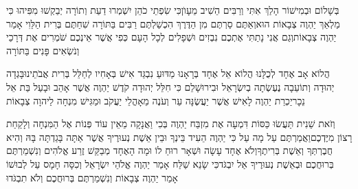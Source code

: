 \documentclass[../main/main.tex]{subfiles}
\begin{document}
\begin{multicols}{\ncols}
בְּשָׁלוֹם וּבְמִישׁוֹר הָלַךְ אִתִּי וְרַבִּים הֵשִׁיב מֵעָוֺן\PreVerseSpace{}כִּי שִׂפְתֵי כֹהֵן יִשְׁמְרוּ דַעַת וְתוֹרָה יְבַקְשׁוּ מִפִּיהוּ כִּי מַלְאַךְ יַהְוֶה צְבָאוֹת הוּא\PreVerseSpace{}וְאַתֶּם סַרְתֶּם מִן הַדֶּרֶךְ הִכְשַׁלְתֶּם רַבִּים בַּתּוֹרָה שִׁחַתֶּם בְּרִית הַלֵּוִי אָמַר יַהְוֶה צְבָאוֹת\PreVerseSpace{}וְגַם אֲנִי נָתַתִּי אֶתְכֶם נִבְזִים וּשְׁפָלִים לְכָל הָעָם כְּפִי אֲשֶׁר אֵינְכֶם שֹׁמְרִים אֶת דְּרָכַי וְנֹשְׂאִים פָּנִים בַּתּוֹרָה\OpenSection{}\par
{}הֲלוֹא אָב אֶחָד לְכֻלָּנוּ הֲלוֹא אֵל אֶחָד בְּרָאָנוּ מַדּוּעַ נִבְגַּד אִישׁ בְּאָחִיו לְחַלֵּל בְּרִית אֲבֹתֵינוּ\PreVerseSpace{}בָּגְדָה יְהוּדָה וְתוֹעֵבָה נֶעֶשְׂתָה בְיִשְׂרָאֵל וּבִירוּשָׁלֵם כִּי חִלֵּל יְהוּדָה קֹדֶשׁ יַהְוֶה אֲשֶׁר אָהֵב וּבָעַל בַּת אֵל נֵכָר\PreVerseSpace{}יַכְרֵת יַהְוֶה לָאִישׁ אֲשֶׁר יַעֲשֶׂנָּה עֵר וְעֹנֶה מֵאָהֳלֵי יַעֲקֹב וּמַגִּישׁ מִנְחָה לַיהוָה צְבָאוֹת\OpenSection{}\par
{}וְזֹאת שֵׁנִית תַּעֲשׂוּ כַּסּוֹת דִּמְעָה אֶת מִזְבַּח יַהְוֶה בְּכִי וַאֲנָקָה מֵאֵין עוֹד פְּנוֹת אֶל הַמִּנְחָה וְלָקַחַת רָצוֹן מִיֶּדְכֶם\PreVerseSpace{}וַאֲמַרְתֶּם עַל מָה עַל כִּי יַהְוֶה הֵעִיד בֵּינְךָ וּבֵין אֵשֶׁת נְעוּרֶיךָ אֲשֶׁר אַתָּה בָּגַדְתָּה בָּהּ וְהִיא חֲבֶרְתְּךָ וְאֵשֶׁת בְּרִיתֶךָ\PreVerseSpace{}וְלֹא אֶחָד עָשָׂה וּשְׁאָר רוּחַ לוֹ וּמָה הָאֶחָד מְבַקֵּשׁ זֶרַע אֱלֹהִים וְנִשְׁמַרְתֶּם בְּרוּחֲכֶם וּבְאֵשֶׁת נְעוּרֶיךָ אַל יִבְגֹּד\PreVerseSpace{}כִּי שָׂנֵא שַׁלַּח אָמַר יַהְוֶה אֱלֹהֵי יִשְׂרָאֵל וְכִסָּה חָמָס עַל לְבוּשׁוֹ אָמַר יַהְוֶה צְבָאוֹת וְנִשְׁמַרְתֶּם בְּרוּחֲכֶם וְלֹא תִבְגֹּדוּ\OpenSection{}\par

\end{multicols}
\end{document}
